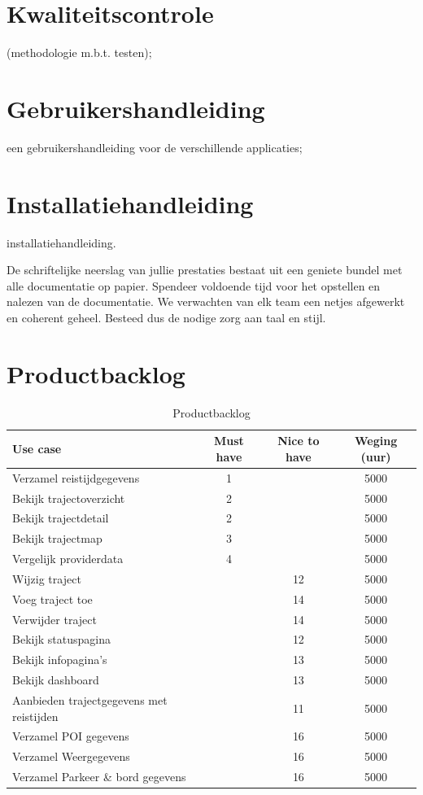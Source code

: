 \documentclass[a4paper]{article}
\begin{document}
\section{Kwaliteitscontrole}
\label{sec:kwaliteitscontrole}

(methodologie m.b.t. testen);
\section{Gebruikershandleiding}
\label{sec:gebruikershandleiding}

een gebruikershandleiding voor de verschillende applicaties;
\section{Installatiehandleiding}
\label{sec:installatiehandleiding}
installatiehandleiding.

De schriftelijke neerslag van jullie prestaties bestaat uit een
geniete bundel met alle documentatie op papier.
Spendeer voldoende tijd voor het opstellen en nalezen van de
documentatie. We verwachten van elk team een netjes afgewerkt
en coherent geheel. Besteed dus de nodige zorg aan taal en stijl.

\section{Productbacklog}
\label{sec:productbacklog}
\begin{table}[H]
\centering
\begin{tabular}{|l|c|c|c|} 
\hline
\textbf{Use case} & \textbf{Must have} & \textbf{Nice to have}  & \textbf{Weging (uur)}\\ \hline \hline
Verzamel reistijdgegevens & 1 & & 5000 \\ \hline 
Bekijk trajectoverzicht & 2 & & 5000 \\ \hline 
Bekijk trajectdetail & 2 & & 5000 \\ \hline 
Bekijk trajectmap & 3 & & 5000 \\ \hline 
Vergelijk providerdata & 4 & & 5000 \\ \hline
Wijzig traject & & 12 & 5000 \\ \hline
Voeg traject toe & & 14 & 5000 \\ \hline
Verwijder traject & & 14 & 5000 \\ \hline
Bekijk statuspagina & & 12 & 5000 \\ \hline 
Bekijk infopagina's & & 13 & 5000 \\ \hline 
Bekijk dashboard & & 13 & 5000 \\ \hline 
Aanbieden trajectgegevens met reistijden & & 11 & 5000 \\ \hline
Verzamel POI gegevens & & 16 & 5000 \\ \hline
Verzamel Weergegevens & & 16 & 5000 \\ \hline
Verzamel Parkeer \& bord gegevens & & 16 & 5000 \\ \hline
\end{tabular}
\caption{Productbacklog \label{productbacklog}}
\end{table}

\newpage

\listoffigures
\listoftables
\end{document}
